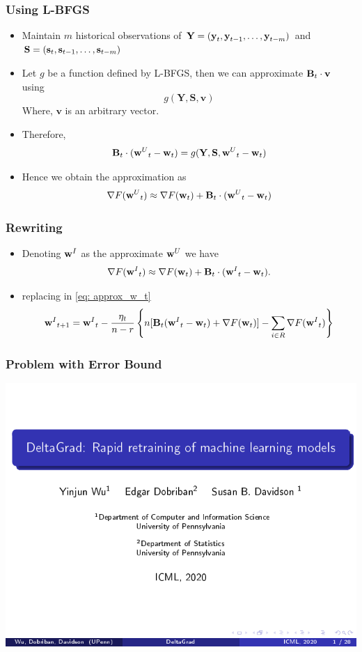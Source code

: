 \documentclass{beamer}
\begin{document}
\begin{frame}
  \frametitle{Using L-BFGS}
  \begin{itemize}
    \item Maintain $m$ historical observations of $\textbf{Y} = (\textbf{y}_{t},\textbf{y}_{t-1},\dots,\textbf{y}_{t-m})$ and $\textbf{S} = (\textbf{s}_{t},\textbf{s}_{t-1},\dots,\textbf{s}_{t-m})$
    \item Let $g$ be a function defined by L-BFGS, then we can approximate $\textbf{B}_{t}\cdot\textbf{v}$ using 
    \[
        g(\textbf{Y},\textbf{S},\textbf{v}) 
    \]
    Where, $\textbf{v}$ is an arbitrary vector.
    \item Therefore,  
    \[ \textbf{B}_{t}\cdot({\textbf{w}^{U}}_{t}-\textbf{w}_{t}) = g(\textbf{Y},\textbf{S},{\textbf{w}^{U}}_{t}-\textbf{w}_{t}) \]
    \item Hence we obtain the approximation as 
    \[
        \nabla F({\textbf{w}^{U}}_{t}) \approx \nabla F(\textbf{w}_{t}) + \textbf{B}_{t} \cdot ({\textbf{w}^{U}}_{t}-\textbf{w}_{t}) 
    \]
  \end{itemize}
\end{frame}

\begin{frame}
  \frametitle{Rewriting}
  \begin{itemize}
    \item Denoting ${\textbf{w}^{I}}$ as the approximate ${\textbf{w}^{U}}$ we have 
    \[
      \nabla F({\textbf{w}^{I}}_{t}) \approx \nabla F(\textbf{w}_{t}) + \textbf{B}_{t} \cdot ({\textbf{w}^{I}}_{t}-\textbf{w}_{t}).
    \]
    \item replacing in \eqref{eq: approx_w_t}
    \[{\textbf{w}^{I}}_{t+1}  = {\textbf{w}^{I}}_{t} - \frac{\eta_{t}}{n-r} \left\{ n[\textbf{B}_{t}({\textbf{w}^{I}}_t - \textbf{w}_t) + \nabla F(\textbf{w}_t)] - \sum_{i\in R} \nabla F({\textbf{w}^{I}}_t)\right\}\]
  \end{itemize}
\end{frame}


\begin{frame}
  \frametitle{Problem with Error Bound}
  \includegraphics[page=43,clip,trim=0.5cm 1cm 0cm 1cm,width=\textwidth]{images/Slides.pdf}
\end{frame}
\end{document}
